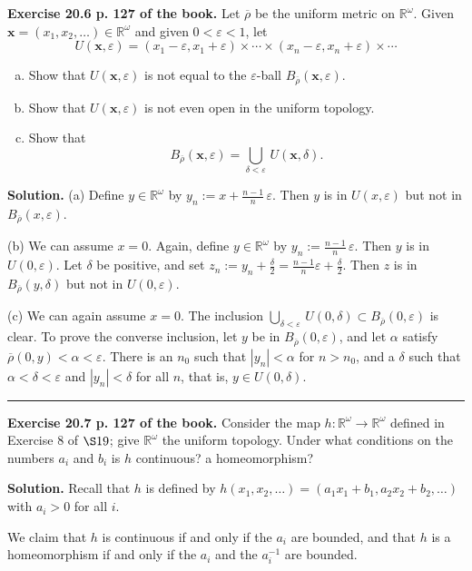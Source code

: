 \documentclass[12pt,letterpaper]{article}
\newcommand{\eps}{\varepsilon}
\newcommand{\noi}{\noindent}%
\newcommand{\R}{\mathbb R}
\begin{document}
\noi\textbf{Exercise 20.6 p. 127 of the book.} Let $\overline{\rho}$ be the uniform metric on $\mathbb{R}^{\omega}$. Given $\mathbf{x} = \left(x_1, x_2, \ldots\right) \in \mathbb{R}^{\omega}$ and given $0 < \eps < 1$, let
    \[
    U(\mathbf{x}, \eps) = \left(x_1 - \eps, x_1 + \eps\right) \times \cdots \times \left(x_{n} - \eps, x_{n} + \eps\right) \times \cdots
    \]
    \begin{enumerate}[(a)]
        \item Show that $U(\mathbf{x},\eps)$ is not equal to the $\eps$-ball $B_{\overline{\rho}}(\mathbf{x}, \eps)$.
        \item Show that $U(\mathbf{x},\eps)$ is not even open in the uniform topology.
        \item Show that
        \[
        B_{\overline{\rho}}(\mathbf{x},\eps)=\bigcup_{\delta < \eps}\,U(\mathbf{x}, \delta).
        \]
    \end{enumerate}

\noi\textbf{Solution.} (a) Define $y\in\R^\omega$ by $y_n:=x+\frac{n-1}n\,\eps$. Then $y$ is in $U(x,\eps)$ but not in $B_{\overline{\rho}}(x,\eps)$. 

\noi(b) We can assume $x=0$. Again, define $y\in\R^\omega$ by $y_n:=\frac{n-1}n\,\eps$. Then $y$ is in $U(0,\eps)$. Let $\delta$ be positive, and set $z_n:=y_n+\frac\delta2=\frac{n-1}n\eps+\frac\delta2$. Then $z$ is in $B_{\overline{\rho}}(y,\delta)$ but not in $U(0,\eps)$. 

\noi(c) We can again assume $x=0$.  The inclusion $\bigcup_{\delta<\eps}\,U(0,\delta)\subset B_{\overline{\rho}}(0,\eps)$ is clear. To prove the converse inclusion, let $y$ be in $B_{\overline\rho}(0,\eps)$, and let $\alpha$ satisfy $\overline\rho(0,y)<\alpha<\eps$. There is an $n_0$ such that $|y_n|<\alpha$ for $n>n_0$, and a $\delta$ such that $\alpha<\delta<\eps$ and $|y_n|<\delta$ for all $n$, that is, $y\in U(0,\delta)$. 

\bigskip\bigskip\hrule\bigskip

\noi\textbf{Exercise 20.7 p. 127 of the book.} Consider the map $h: \mathbb{R}^{\omega} \rightarrow \mathbb{R}^{\omega}$ defined in Exercise 8 of $\S 19$; give $\mathbb{R}^{\omega}$ the uniform topology. Under what conditions on the numbers $a_{i}$ and $b_{i}$ is $h$ continuous? a homeomorphism? 

\noi\textbf{Solution.} Recall that $h$ is defined by $h(x_1,x_2,\ldots)=(a_1x_1+b_1,a_2x_2+b_2, \ldots)$ with $a_i>0$ for all $i$. 

We claim that $h$ is continuous if and only if the $a_i$ are bounded, and that $h$ is a homeomorphism if and only if the $a_i$ and the $a_i^{-1}$ are bounded. 
\end{document}
